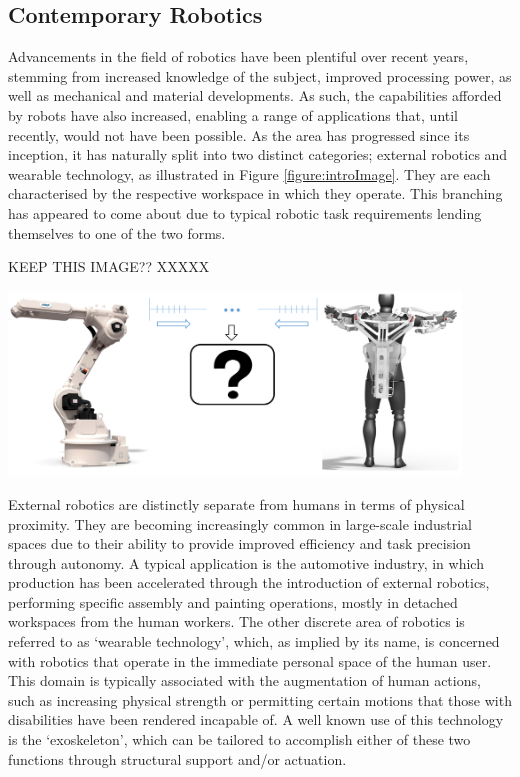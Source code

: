 \documentclass[11pt]{article}
\begin{document}
\subsection{Contemporary Robotics}
Advancements in the field of robotics have been plentiful over recent years, stemming from increased knowledge of the subject, improved processing power, as well as mechanical and material developments. As such, the capabilities afforded by robots have also increased, enabling a range of applications that, until recently, would not have been possible. As the area has progressed since its inception, it has naturally split into two distinct categories; external robotics and wearable technology, as illustrated in Figure \ref{figure:introImage}. They are each characterised by the respective workspace in which they operate. This branching has appeared to come about due to typical robotic task requirements lending themselves to one of the two forms.

KEEP THIS IMAGE?? XXXXX

\begin{center}
\includegraphics[width=0.9\textwidth]{images/introImage.png}
\label{figure:introImage}
\end{center}

External robotics are distinctly separate from humans in terms of physical proximity. They are becoming increasingly common in large-scale industrial spaces due to their ability to provide improved efficiency and task precision through autonomy. A typical application is the automotive industry, in which production has been accelerated through the introduction of external robotics, performing specific assembly and painting operations, mostly in detached workspaces from the human workers. The other discrete area of robotics is referred to as `wearable technology', which, as implied by its name, is concerned with robotics that operate in the immediate personal space of the human user. This domain is typically associated with the augmentation of human actions, such as increasing physical strength or permitting certain motions that those with disabilities have been rendered incapable of. A well known use of this technology is the `exoskeleton', which can be tailored to accomplish either of these two functions through structural support and/or actuation.
\end{document}
